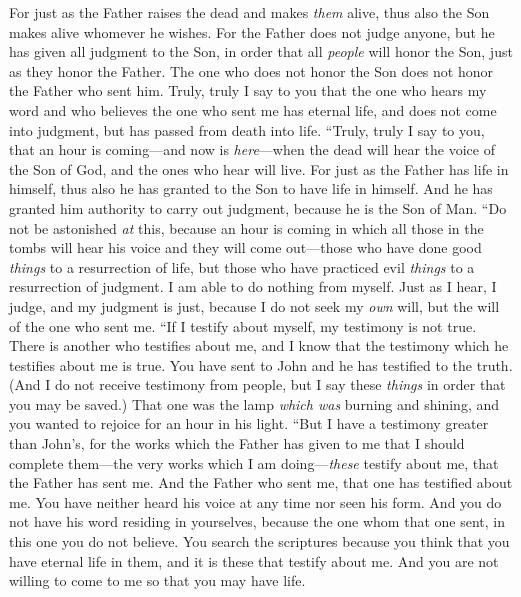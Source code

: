 \begin{biblechapter}
\verse For just as the Father raises the dead and makes \textit{them} alive, thus also the Son makes alive whomever he wishes.
\verse For the Father does not judge anyone, but he has given all judgment to the Son,
\verse in order that all \textit{people} will honor the Son, just as they honor the Father. The one who does not honor the Son does not honor the Father who sent him.
\verse Truly, truly I say to you that the one who hears my word and who believes the one who sent me has eternal life, and does not come into judgment, but has passed from death into life.
\verse “Truly, truly I say to you, that an hour is coming—and now is \textit{here}—when the dead will hear the voice of the Son of God, and the ones who hear will live.
\verse For just as the Father has life in himself, thus also he has granted to the Son to have life in himself.
\verse And he has granted him authority to carry out judgment, because he is the Son of Man.
\verse “Do not be astonished \textit{at} this, because an hour is coming in which all those in the tombs will hear his voice
\verse and they will come out—those who have done good \textit{things} to a resurrection of life, but those who have practiced evil \textit{things} to a resurrection of judgment.
\verse I am able to do nothing from myself. Just as I hear, I judge, and my judgment is just, because I do not seek my \textit{own} will, but the will of the one who sent me.
 “If I testify about myself, my testimony is not true.
\verse There is another who testifies about me, and I know that the testimony which he testifies about me is true.
\verse You have sent to John and he has testified to the truth.
\verse (And I do not receive testimony from people, but I say these \textit{things} in order that you may be saved.)
\verse That one was the lamp \textit{which was} burning and shining, and you wanted to rejoice for an hour in his light.
\verse “But I have a testimony greater than John’s, for the works which the Father has given to me that I should complete them—the very works which I am doing—\textit{these} testify about me, that the Father has sent me.
\verse And the Father who sent me, that one has testified about me. You have neither heard his voice at any time nor seen his form.
\verse And you do not have his word residing in yourselves, because the one whom that one sent, in this one you do not believe.
\verse You search the scriptures because you think that you have eternal life in them, and it is these that testify about me.
\verse And you are not willing to come to me so that you may have life.

\end{biblechapter}
